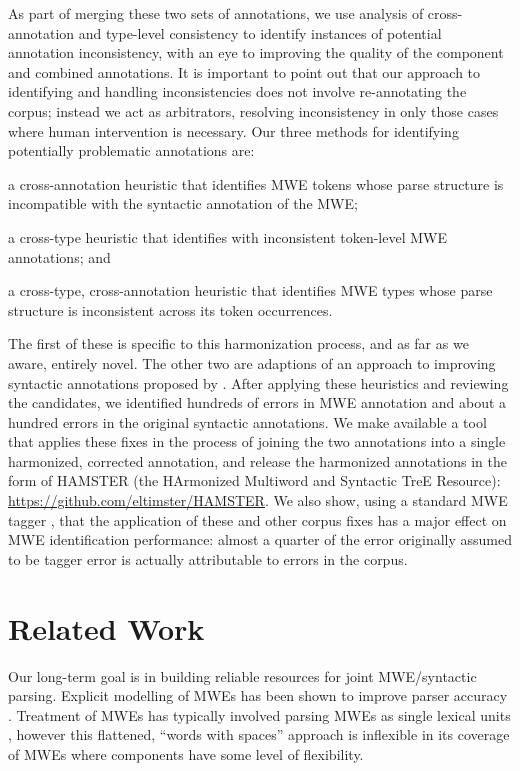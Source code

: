 \documentclass[output=paper
,modfonts
,nonflat]{langsci/langscibook}
\begin{document}
As part of merging these two sets of annotations, we use analysis of cross-annotation and type-level consistency to identify instances of potential annotation inconsistency, with an eye to improving the quality of the component and combined annotations. It is important to point out that our approach to identifying and handling inconsistencies does not involve re-annotating the corpus; instead we act as arbitrators, resolving inconsistency in only those cases where human intervention is necessary. Our three methods for identifying potentially problematic annotations are:
\begin{compactitem}
\item a cross-annotation heuristic that identifies MWE tokens whose parse structure is incompatible with the syntactic annotation of the MWE;
\item a cross-type heuristic that identifies \ngram[s] with inconsistent token-level MWE annotations; and
\item a cross-type, cross-annotation heuristic that identifies MWE types whose parse structure is inconsistent across its token occurrences.
\end{compactitem}
The first of these is specific to this harmonization process, and as far as we aware, entirely novel. The other two are adaptions of an approach to improving syntactic annotations proposed by \citet{Dickinson03}. After applying these heuristics and reviewing the candidates, we identified hundreds of errors in MWE annotation and about a hundred errors in the original syntactic annotations. We make available a tool that applies these fixes in the process of joining the two annotations into a single harmonized, corrected annotation, and release the harmonized annotations in the form of HAMSTER (the HArmonized Multiword and Syntactic TreE Resource): \url{https://github.com/eltimster/HAMSTER}. We also show, using a standard MWE tagger \citet{Schneider14b}, that the application of these and other corpus fixes has a major effect on MWE identification performance: almost a quarter of the error originally assumed to be tagger error is actually attributable to errors in the corpus.


\section{Related Work}
\label{sec:relwork}

Our long-term goal is in building reliable resources for joint MWE/syntactic parsing. Explicit modelling of MWEs has been shown to improve parser accuracy \citep{nivre04acl,Seretan:Wehrli:2006,Finkeletal09,Korkontzelos:2010:RME:1857999.1858088,Green:2013:PMI:2464100.2464109,hulvc,Wehrli:2010,candito-constant:acl:2014,constant-nivre:acl:2016}. Treatment of MWEs has typically involved parsing MWEs as single lexical units \citep{nivre04acl,Eryigit:2011:MES:2206359.2206365,Fotopoulou14}, however this flattened, ``words with spaces'' \citep{Sag2002a} approach is inflexible in its coverage of MWEs where components have some level of flexibility.
\end{document}
